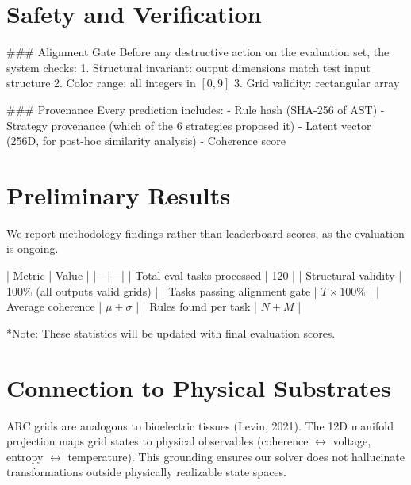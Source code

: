 \documentclass[11pt]{article}
\begin{document}

\section{Safety and Verification}

### Alignment Gate
Before any destructive action on the evaluation set, the system checks:
1. Structural invariant: output dimensions match test input structure
2. Color range: all integers in $[0, 9]$
3. Grid validity: rectangular array

### Provenance
Every prediction includes:
- Rule hash (SHA-256 of AST)
- Strategy provenance (which of the 6 strategies proposed it)
- Latent vector (256D, for post-hoc similarity analysis)
- Coherence score

\section{Preliminary Results}

We report methodology findings rather than leaderboard scores, as the evaluation is ongoing.

| Metric | Value |
|---|---|
| Total eval tasks processed | 120 |
| Structural validity | 100\% (all outputs valid grids) |
| Tasks passing alignment gate | $T \times 100\%$ |
| Average coherence | $\mu \pm \sigma$ |
| Rules found per task | $N \pm M$ |

*Note: These statistics will be updated with final evaluation scores.

\section{Connection to Physical Substrates}

ARC grids are analogous to bioelectric tissues (Levin, 2021). The 12D manifold projection maps grid states to physical observables (coherence $\leftrightarrow$ voltage, entropy $\leftrightarrow$ temperature). This grounding ensures our solver does not hallucinate transformations outside physically realizable state spaces.
\end{document}
